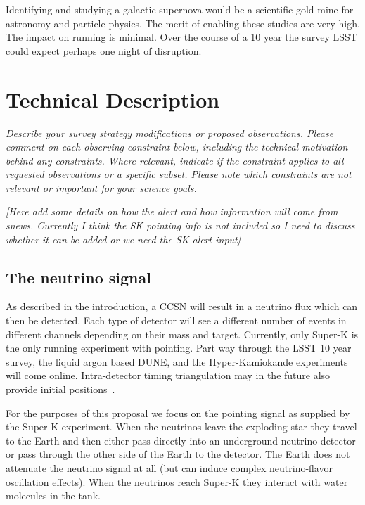 \documentclass[11pt]{article}
\newcommand{\superk}  {Super\nobreakdash-K\xspace}
\begin{document}
Identifying and studying a galactic supernova would be a scientific
gold-mine for astronomy and particle physics.  The merit of enabling
these studies are very high. The impact on running is minimal.  Over
the course of a 10 year the survey LSST could expect perhaps one night of
disruption.

\section{Technical Description}
\begin{footnotesize}
{\it Describe your survey strategy modifications or proposed observations. Please comment on each observing constraint
below, including the technical motivation behind any constraints. Where relevant, indicate
if the constraint applies to all requested observations or a specific subset. Please note which 
constraints are not relevant or important for your science goals.}
\end{footnotesize}

{\it [Here add some details on how the alert and how information will come
from snews.  Currently I think the SK pointing info is not included so
I need to discuss whether it can be added or we need the SK alert input]}

\subsection{The neutrino signal}
\label{sec:signal}

As described in the introduction, a CCSN will result in a neutrino
flux which can then be detected.  Each type of detector will see a
different number of events in different channels depending on their
mass and target.  Currently, only \superk is the only running
experiment with pointing.  Part way through the LSST 10 year
survey, the liquid argon based DUNE, and the Hyper-Kamiokande
experiments will come online.  Intra-detector timing triangulation may
in the future also provide initial positions~\cite{Katepaper}.

For the purposes of this proposal we focus on the pointing signal as
supplied by the \superk experiment.  When the neutrinos leave the
exploding star they travel to the Earth and then either pass directly
into an underground neutrino detector or pass through the other side
of the Earth to the detector. The Earth does not attenuate the
neutrino signal at all (but can induce complex neutrino-flavor
oscillation effects).  When the neutrinos reach \superk they interact
with water molecules in the tank.
\end{document}
